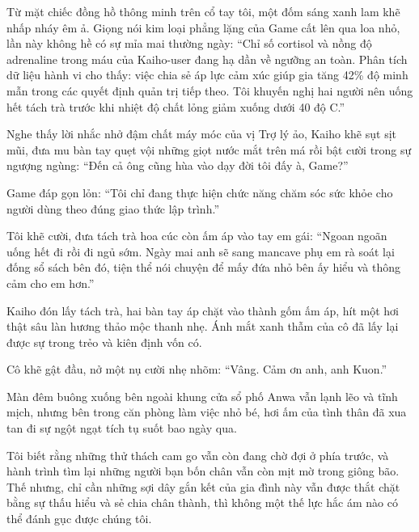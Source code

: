 \documentclass[../main.tex]{subfiles}
\begin{document}
Từ mặt chiếc đồng hồ thông minh trên cổ tay tôi, một đốm sáng xanh lam khẽ nhấp nháy êm ả. Giọng nói kim loại phẳng lặng của Game cất lên qua loa nhỏ, lần này không hề có sự mỉa mai thường ngày: ``Chỉ số cortisol và nồng độ adrenaline trong máu của Kaiho-user đang hạ dần về ngưỡng an toàn. Phân tích dữ liệu hành vi cho thấy: việc chia sẻ áp lực cảm xúc giúp gia tăng 42\% độ minh mẫn trong các quyết định quản trị tiếp theo. Tôi khuyến nghị hai người nên uống hết tách trà trước khi nhiệt độ chất lỏng giảm xuống dưới 40 độ C.''

Nghe thấy lời nhắc nhở đậm chất máy móc của vị Trợ lý ảo, Kaiho khẽ sụt sịt mũi, đưa mu bàn tay quẹt vội những giọt nước mắt trên má rồi bật cười trong sự ngượng ngùng: ``Đến cả ông cũng hùa vào dạy đời tôi đấy à, Game?''

Game đáp gọn lỏn: ``Tôi chỉ đang thực hiện chức năng chăm sóc sức khỏe cho người dùng theo đúng giao thức lập trình.''

Tôi khẽ cười, đưa tách trà hoa cúc còn ấm áp vào tay em gái: ``Ngoan ngoãn uống hết đi rồi đi ngủ sớm. Ngày mai anh sẽ sang mancave phụ em rà soát lại đống sổ sách bên đó, tiện thể nói chuyện để mấy đứa nhỏ bên ấy hiểu và thông cảm cho em hơn.''

Kaiho đón lấy tách trà, hai bàn tay áp chặt vào thành gốm ấm áp, hít một hơi thật sâu làn hương thảo mộc thanh nhẹ. Ánh mắt xanh thẫm của cô đã lấy lại được sự trong trẻo và kiên định vốn có.

Cô khẽ gật đầu, nở một nụ cười nhẹ nhõm: ``Vâng. Cảm ơn anh, anh Kuon.''

Màn đêm buông xuống bên ngoài khung cửa sổ phố Anwa vẫn lạnh lẽo và tĩnh mịch, nhưng bên trong căn phòng làm việc nhỏ bé, hơi ấm của tình thân đã xua tan đi sự ngột ngạt tích tụ suốt bao ngày qua.

Tôi biết rằng những thử thách cam go vẫn còn đang chờ đợi ở phía trước, và hành trình tìm lại những người bạn bốn chân vẫn còn mịt mờ trong giông bão. Thế nhưng, chỉ cần những sợi dây gắn kết của gia đình này vẫn được thắt chặt bằng sự thấu hiểu và sẻ chia chân thành, thì không một thế lực hắc ám nào có thể đánh gục được chúng tôi.
\end{document}
